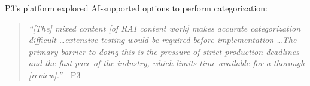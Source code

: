  P3's platform explored AI-supported options to perform categorization: 
\begin{quote}
    \textit{``[The] mixed content [of RAI content work] makes accurate categorization difficult \dots extensive testing would be required before implementation \dots The primary barrier to doing this is the pressure of strict production deadlines and the fast pace of the industry, which limits time available for a thorough [review].''} - P3
\end{quote} 

